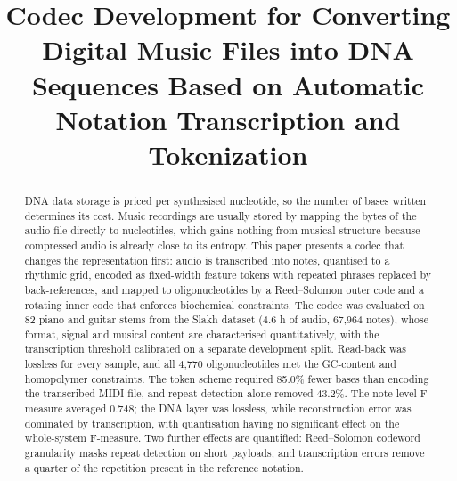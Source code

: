 \documentclass[conference]{IEEEtran}
\begin{document}
\title{Codec Development for Converting Digital Music Files into DNA Sequences Based on Automatic Notation Transcription and Tokenization}

\author{
\and
{}
}

\maketitle

\begin{abstract}
DNA data storage is priced per synthesised nucleotide, so the number of bases written determines its cost. Music recordings are usually stored by mapping the bytes of the audio file directly to nucleotides, which gains nothing from musical structure because compressed audio is already close to its entropy. This paper presents a codec that changes the representation first: audio is transcribed into notes, quantised to a rhythmic grid, encoded as fixed-width feature tokens with repeated phrases replaced by back-references, and mapped to oligonucleotides by a Reed--Solomon outer code and a rotating inner code that enforces biochemical constraints. The codec was evaluated on 82 piano and guitar stems from the Slakh dataset (4.6 h of audio, 67,964 notes), whose format, signal and musical content are characterised quantitatively, with the transcription threshold calibrated on a separate development split. Read-back was lossless for every sample, and all 4,770 oligonucleotides met the GC-content and homopolymer constraints. The token scheme required 85.0\% fewer bases than encoding the transcribed MIDI file, and repeat detection alone removed 43.2\%. The note-level F-measure averaged 0.748; the DNA layer was lossless, while reconstruction error was dominated by transcription, with quantisation having no significant effect on the whole-system F-measure. Two further effects are quantified: Reed--Solomon codeword granularity masks repeat detection on short payloads, and transcription errors remove a quarter of the repetition present in the reference notation.
\end{abstract}
\end{document}
